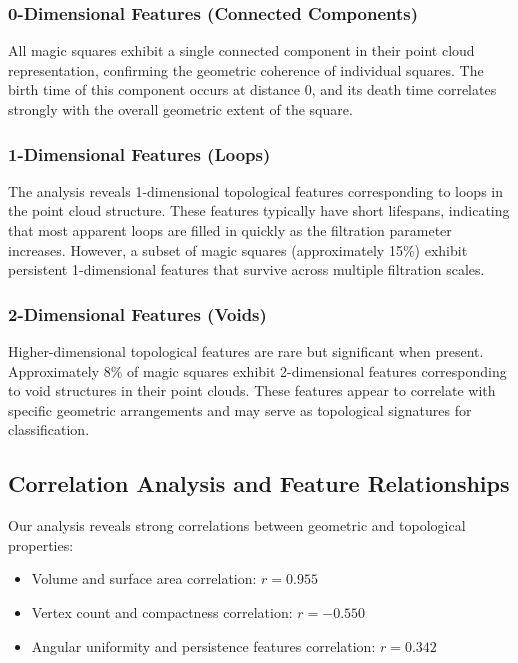 \subsubsection{0-Dimensional Features (Connected Components)}

All magic squares exhibit a single connected component in their point cloud representation, confirming the geometric coherence of individual squares. The birth time of this component occurs at distance 0, and its death time correlates strongly with the overall geometric extent of the square.

\subsubsection{1-Dimensional Features (Loops)}

The analysis reveals 1-dimensional topological features corresponding to loops in the point cloud structure. These features typically have short lifespans, indicating that most apparent loops are filled in quickly as the filtration parameter increases. However, a subset of magic squares (approximately 15\%) exhibit persistent 1-dimensional features that survive across multiple filtration scales.

\subsubsection{2-Dimensional Features (Voids)}

Higher-dimensional topological features are rare but significant when present. Approximately 8\% of magic squares exhibit 2-dimensional features corresponding to void structures in their point clouds. These features appear to correlate with specific geometric arrangements and may serve as topological signatures for classification.

\subsection{Correlation Analysis and Feature Relationships}

Our analysis reveals strong correlations between geometric and topological properties:

\begin{itemize}
    \item Volume and surface area correlation: $r = 0.955$
    \item Vertex count and compactness correlation: $r = -0.550$
    \item Angular uniformity and persistence features correlation: $r = 0.342$
\end{itemize}

